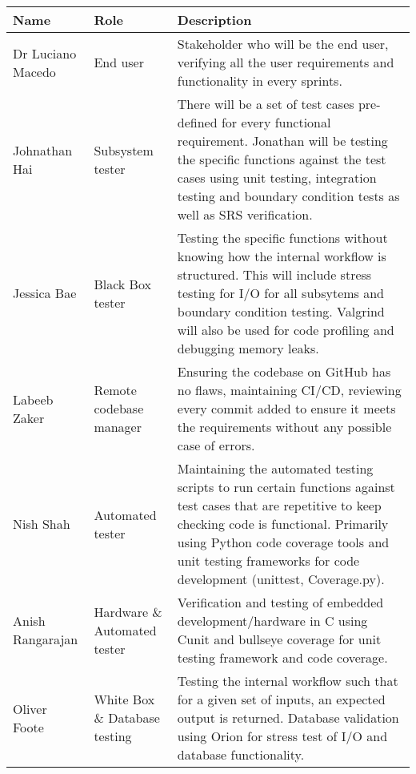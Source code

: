 \documentclass[12pt, titlepage]{article}
\begin{document}
\begin{center}
\begin{tabular}{|m{5em}|m{5em}|m{25em}|}

  \hline
  \textbf{Name}     & \textbf{Role}           & \textbf{Description}                                                                                                                                                                        \\
  \hline
  Dr Luciano Macedo & End user                & Stakeholder who will be the end user, verifying all the user requirements and functionality in every sprints.                                                                                                             \\
  \hline
  Johnathan Hai     & Subsystem tester       & There will be a set of test cases pre-defined for every functional requirement. Jonathan will be testing the specific functions against the test cases using unit testing, integration testing and boundary condition tests as well as SRS verification. \\
  \hline
  Jessica Bae       & Black Box tester        & Testing the specific functions without knowing how the internal workflow is structured. This will include stress testing for I/O for all subsytems and boundary condition testing. Valgrind will also be used for code profiling and debugging memory leaks.                                                                                         \\
  \hline
  Labeeb Zaker      & Remote codebase manager & Ensuring the codebase on GitHub has no flaws, maintaining CI/CD, reviewing every commit added to ensure it meets the requirements without any possible case of errors. \\
  \hline
  Nish Shah         & Automated tester        & Maintaining the automated testing scripts to run certain functions against test cases that are repetitive to keep checking code is functional. Primarily using Python code coverage tools and unit testing frameworks for code development (unittest, Coverage.py).                                                          \\
  \hline
  Anish Rangarajan  & Hardware \& Automated tester    & Verification and testing of embedded development/hardware in C using Cunit and bullseye coverage for unit testing framework and code coverage.\\
  \hline
  Oliver Foote      & White Box \& Database testing        & Testing the internal workflow such that for a given set of inputs, an expected output is returned. Database validation using Orion for stress test of I/O and database functionality. \\
  \hline

\end{tabular}
  \end{center}
\end{document}

